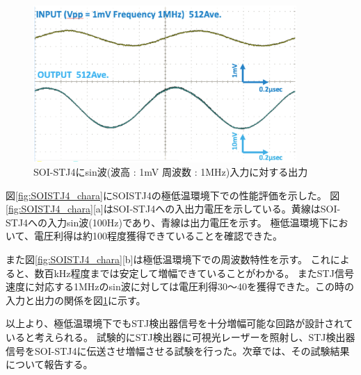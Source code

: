 		\begin{figure}[htbp]
			\begin{center}
				\includegraphics[width=10.0cm]{./Chapter/Chapter3/Picture/SOISTJ4_InOut_1MHz.eps}
				\caption{SOI-STJ4にsin波(波高 : 1mV  周波数 : 1MHz)入力に対する出力}
				\label{fig:SOISTJ4_InOut_1MHz}
			\end{center}
		\end{figure}
		
		図\ref{fig:SOISTJ4_chara}にSOISTJ4の極低温環境下での性能評価を示した。
		図\ref{fig:SOISTJ4_chara}[a]はSOI-STJ4への入出力電圧を示している。黄線はSOI-STJ4への入力sin波(100Hz)であり、青線は出力電圧を示す。
		極低温環境下において、電圧利得は約100程度獲得できていることを確認できた。
		
		また図\ref{fig:SOISTJ4_chara}[b]は極低温環境下での周波数特性を示す。
		これによると、数百kHz程度までは安定して増幅できていることがわかる。
		またSTJ信号速度に対応する1MHzのsin波に対しては電圧利得30〜40を獲得できた。この時の入力と出力の関係を図\ref{fig:SOISTJ4_InOut_1MHz}に示す。
		
		以上より、極低温環境下でもSTJ検出器信号を十分増幅可能な回路が設計されていると考えられる。
		試験的にSTJ検出器に可視光レーザーを照射し、STJ検出器信号をSOI-STJ4に伝送させ増幅させる試験を行った。次章では、その試験結果について報告する。
		
		